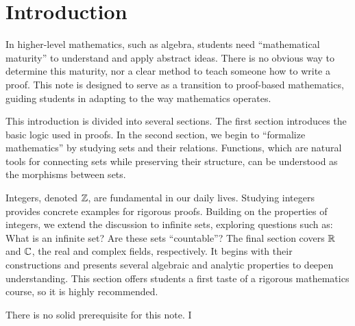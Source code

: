 \documentclass[10pt]{article}
\begin{document}
\def\htitle{An Introduction to Proofs}
\def\hauthor{Hassium}
\hsetup
\htoc
\hmain
\section*{Introduction}
In higher-level mathematics, such as algebra, students need ``mathematical maturity'' to understand and apply abstract ideas. There is no obvious way to determine this maturity, nor a clear method to teach someone how to write a proof. This note is designed to serve as a transition to proof-based mathematics, guiding students in adapting to the way mathematics operates.
\par
This introduction is divided into several sections. The first section introduces the basic logic used in proofs. In the second section, we begin to “formalize mathematics” by studying sets and their relations. Functions, which are natural tools for connecting sets while preserving their structure, can be understood as the morphisms between sets. 

Integers, denoted $\mathbb{Z}$, are fundamental in our daily lives. Studying integers provides concrete examples for rigorous proofs. Building on the properties of integers, we extend the discussion to infinite sets, exploring questions such as: What is an infinite set? Are these sets “countable”? The final section covers $\mathbb{R}$ and $\mathbb{C}$, the real and complex fields, respectively. It begins with their constructions and presents several algebraic and analytic properties to deepen understanding. This section offers students a first taste of a rigorous mathematics course, so it is highly recommended.
\par
There is no solid prerequisite for this note. I 



\pagebreak
\end{document}
